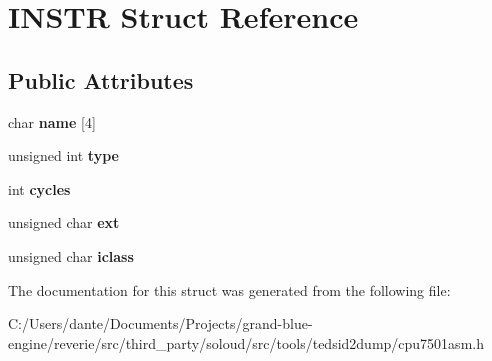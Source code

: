 \hypertarget{struct_i_n_s_t_r}{}\section{I\+N\+S\+TR Struct Reference}
\label{struct_i_n_s_t_r}
\subsection*{Public Attributes}
\begin{DoxyCompactItemize}
\item 
\mbox{\label{struct_i_n_s_t_r_a3b67bb12ceec01c5362881867e2eacc2}} 
char {\bfseries name} \mbox{[}4\mbox{]}
\item 
\mbox{\label{struct_i_n_s_t_r_a4043780eea3b161f8ec0c83b9b1de1a0}} 
unsigned int {\bfseries type}
\item 
\mbox{\label{struct_i_n_s_t_r_a12de0e24c38c8a8be4947e8accc0e380}} 
int {\bfseries cycles}
\item 
\mbox{\label{struct_i_n_s_t_r_a8846b6ea8a91cbe925f9caa30a5aed5c}} 
unsigned char {\bfseries ext}
\item 
\mbox{\label{struct_i_n_s_t_r_a9e5e7dbb78710a799b5d785ce0ef4b71}} 
unsigned char {\bfseries iclass}
\end{DoxyCompactItemize}


The documentation for this struct was generated from the following file\+:\begin{DoxyCompactItemize}
\item 
C\+:/\+Users/dante/\+Documents/\+Projects/grand-\/blue-\/engine/reverie/src/third\+\_\+party/soloud/src/tools/tedsid2dump/cpu7501asm.\+h\end{DoxyCompactItemize}
